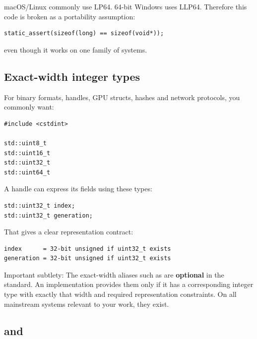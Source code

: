 macOS/Linux commonly use LP64. 64-bit Windows uses LLP64. Therefore this code is broken as a portability assumption:

\begin{verbatim}
static_assert(sizeof(long) == sizeof(void*));
\end{verbatim}

even though it works on one family of systems.

\subsection{Exact-width integer types}\label{05-engine-i-ch002-exact-width-integer-types}

\hypertarget{05-engine-i-ch002-exact-width-integer-types}{}

For binary formats, handles, GPU structs, hashes and network protocols, you commonly want:

\begin{verbatim}
#include <cstdint>

std::uint8_t
std::uint16_t
std::uint32_t
std::uint64_t
\end{verbatim}

A handle can express its fields using these types:

\begin{verbatim}
std::uint32_t index;
std::uint32_t generation;
\end{verbatim}

That gives a clear representation contract:

\begin{verbatim}
index      = 32-bit unsigned if uint32_t exists
generation = 32-bit unsigned if uint32_t exists
\end{verbatim}

Important subtlety: The exact-width aliases such as  are \textbf{optional} in the standard. An implementation provides them only if it has a corresponding integer type with exactly that width and required representation constraints. On all mainstream systems relevant to your work, they exist.

\subsection{\texorpdfstring{ and }{ and }}\label{05-engine-i-ch002-least-and-fast}

